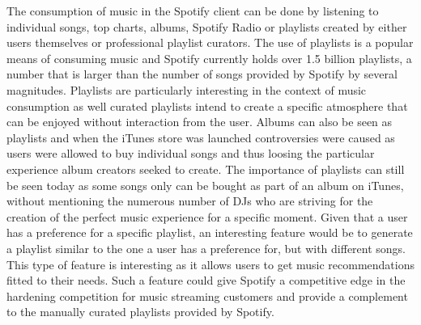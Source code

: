\documentclass[a4paper,11pt]{kth-mag}
\begin{document}
The consumption of music in the Spotify client can be done by listening to individual songs, top charts, albums, Spotify Radio or playlists created by either users themselves or professional playlist curators. The use of playlists is a popular means of consuming music and Spotify currently holds over 1.5 billion playlists, a number that is larger than the number of songs provided by Spotify by several magnitudes\cite{spotifyPress}. Playlists are particularly interesting in the context of music consumption as well curated playlists intend to create a specific atmosphere that can be enjoyed without interaction from the user. Albums can also be seen as playlists and when the iTunes store was launched controversies were caused as users were allowed to buy individual songs and thus loosing the particular experience album creators seeked to create. The importance of playlists can still be seen today as some songs only can be bought as part of an album on iTunes, without mentioning the numerous number of DJs who are striving for the creation of the perfect music experience for a specific moment. 
Given that a user has a preference for a specific playlist, an interesting feature would be to generate a playlist similar to the one a user has a preference for, but with different songs. This type of feature is interesting as it allows users to get music recommendations fitted to their needs. Such a feature could give Spotify a competitive edge in the hardening competition for music streaming customers and provide a complement to the manually curated playlists provided by Spotify.
\end{document}
